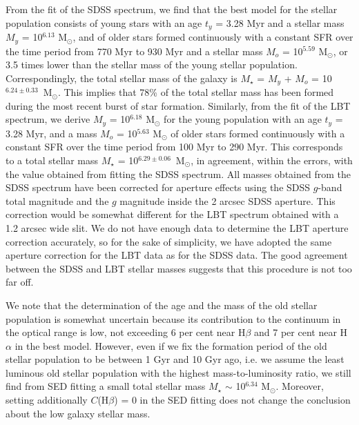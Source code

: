 \documentclass[useAMS,usenatbib]{mn2e}
\begin{document}
From the fit of the SDSS spectrum, we find that the best model for the stellar 
population consists of young
stars with an age $t_y$ = 3.28 Myr and a stellar mass 
$M_y$ = 10$^{6.13}$ M$_\odot$, and of older stars formed continuously with 
a constant SFR over the time period from 770 Myr to 930 Myr and a stellar 
mass $M_o$ = 10$^{5.59}$ M$_\odot$, or 3.5 times lower than the stellar mass of 
the young stellar population. Correspondingly, the total stellar mass of the 
galaxy is $M_\star$ = $M_y$ + $M_o$ = 10$^{6.24\pm0.33}$~M$_\odot$. 
This implies that 78\% of the total stellar mass has been formed during the 
most recent burst of star formation.
Similarly, from the fit of the LBT spectrum, we derive 
$M_y$ = 10$^{6.18}$ M$_\odot$ for the young population with an age 
$t_y$ = 3.28 Myr, and a mass $M_o$ = 10$^{5.63}$ M$_\odot$ of older stars formed
continuously with a constant SFR over the time period from 100 Myr to 290 Myr.
This corresponds to a total stellar mass $M_\star$ = 10$^{6.29\pm0.06}$~M$_\odot$, in
agreement, within the errors, with the value obtained from fitting the SDSS 
spectrum. 
All masses obtained from the SDSS spectrum have been corrected for aperture effects 
using the SDSS $g$-band total magnitude and the 
$g$ magnitude inside the 2 arcsec SDSS aperture. This correction would be somewhat different 
for the LBT spectrum obtained with a 1.2 arcsec wide slit. We do not have enough data to determine the 
LBT aperture correction accurately, so for the sake of simplicity, we have 
adopted the same aperture correction for the LBT data as for the SDSS data.
The good agreement between the SDSS and LBT stellar masses suggests that this 
procedure is not too far off. 

We note that the determination
of the age and the mass of the old stellar population is somewhat uncertain
because its contribution to the continuum in the optical range is low, not
exceeding 6 per cent near H$\beta$ and 7 per cent near H$\alpha$ in the best
model. However, even if we fix the formation period of the old stellar 
population to be between 1 Gyr and 10 Gyr ago, i.e. we assume the least luminous
old stellar population with the highest mass-to-luminosity ratio, we still find 
from SED fitting a small total stellar mass $M_\star$ $\sim$ 10$^{6.34}$ M$_\odot$.
Moreover, setting additionally $C$(H$\beta$) = 0 in the SED fitting does not 
change the conclusion about the low galaxy stellar mass.
\end{document}
